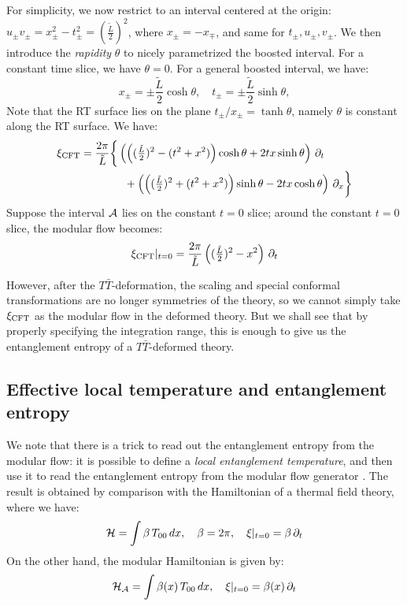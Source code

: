 \documentclass[11pt,a4paper,utf8]{article}
\newcommand{\TTbar}{\ensuremath{T\bar{T}}\xspace}
\begin{document}
	For simplicity, we now restrict to an interval centered at the origin: $
		u_\pm v_\pm
		= x^2_\pm - t^2_\pm
		= (\frac{{\tilde L}}{2})^2
	$, where $x_\pm = -x_\mp$, and same for $t_\pm, u_\pm, v_\pm$. 
	We then introduce the \textit{rapidity} $\theta$ to nicely parametrized the boosted interval. For a constant time slice, we have $\theta = 0$. For a general boosted interval, we have:
	\begin{equation}
		x_\pm = \pm \frac{{\tilde L}}{2} \cosh \theta,
	\quad
		t_\pm = \pm \frac{{\tilde L}}{2} \sinh \theta,
	\end{equation}
	Note that the RT surface lies on the plane $
		t_\pm / x_\pm = \tanh \theta
	$, namely $\theta$ is constant along the RT surface. 
	We have:
	\begin{gather}
	\begin{aligned}
		\xi_{\mathrm{CFT}} &= \frac{2\pi}{{\tilde L}} \bigg\{
			\left(
				\left(
					(\tfrac{{\tilde L}}{2})^2
					- (t^2 + x^2)
				\right) \cosh\theta
				+ 2tx \sinh\theta
			\right) \,\partial_{t}
		\\ &\qquad\qquad 
			+ \left(
				\left(
					(\tfrac{{\tilde L}}{2})^2
					+ (t^2 + x^2)
				\right) \sinh\theta
				- 2tx \cosh\theta
			\right) \,\partial_{x}
		\bigg\}
	\end{aligned}
	\end{gather}
	Suppose the interval $\mathcal{A}$ lies on the constant $t = 0$ slice; around the constant $t = 0$ slice, the modular flow becomes:
	\begin{equation}
		\xi_{\mathrm{CFT}}|_{t = 0} 
		= \frac{2\pi}{{\tilde L}}
			\left(
				(\tfrac{{\tilde L}}{2})^2
				- x^2
			\right) \,\partial_{t}
	\end{equation}
	
	However, after the \TTbar-deformation, the scaling and special conformal transformations are no longer symmetries of the theory, so we cannot simply take $\xi_{\mathrm{CFT}}$ as the modular flow in the deformed theory. 
	But we shall see that by properly specifying the integration range, this is enough to give us the entanglement entropy of a \TTbar-deformed theory. 

\subsection{Effective local temperature and entanglement entropy}
	
	We note that there is a trick to read out the entanglement entropy from the modular flow: it is possible to define a \textit{local entanglement temperature}, and then use it to read the entanglement entropy from the modular flow generator \cite{Wong:2013gua,Cardy:2016fqc}. The result is obtained by comparison with the Hamiltonian of a thermal field theory, where we have:
	\begin{equation}
	\mathcal{H}=\int \beta\,T_{00}\,dx,\quad \beta = 2\pi,
	\quad \xi|_{t=0} = \beta\,\partial_{t}
	\label{eq:beta_thermal}
	\end{equation}
	On the other hand, the modular Hamiltonian is given by:
	\begin{equation}
	\mathcal{H}_{\mathcal{A}}=\int \beta(x)\, T_{00}\,dx,\quad \xi|_{t=0} = \beta(x)\, \partial_{t}
	\end{equation}
	
\end{document}
